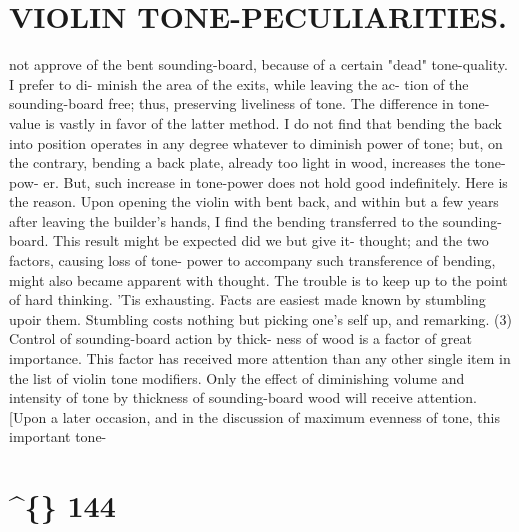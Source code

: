 \documentclass{article}
\begin{document}
\section*{VIOLIN TONE-PECULIARITIES.}
not approve of the bent sounding-board, because of a certain "dead" tone-quality. I prefer to di- minish the area of the exits, while leaving the ac- tion of the sounding-board free; thus, preserving liveliness of tone. The difference in tone-value is vastly in favor of the latter method. I do not find that bending the back into position operates in any degree whatever to diminish power of tone; but, on the contrary, bending a back plate, already too light in wood, increases the tone-pow- er. But, such increase in tone-power does not hold good indefinitely. Here is the reason. Upon opening the violin with bent back, and within but a few years after leaving the builder's hands, I find the bending transferred to the sounding-board. This result might be expected did we but give it- thought; and the two factors, causing loss of tone- power to accompany such transference of bending, might also became apparent with thought. The trouble is to keep up to the point of hard thinking. 'Tis exhausting. Facts are easiest made known by stumbling upoir them. Stumbling costs nothing but picking one's self up, and remarking. (3) Control of sounding-board action by thick- ness of wood is a factor of great importance. This factor has received more attention than any other single item in the list of violin tone modifiers. Only the effect of diminishing volume and intensity of tone by thickness of sounding-board wood will receive attention. [Upon a later occasion, and in the discussion of maximum evenness of tone, this important tone-

\section*{\textasciicircum\{\} 144}
\end{document}
